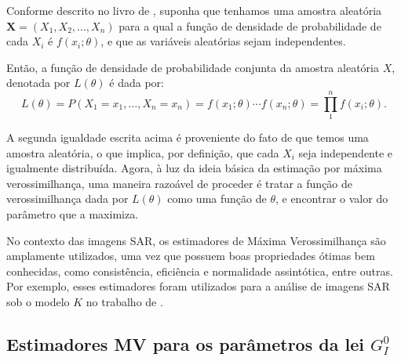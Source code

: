 Conforme descrito no livro de \citet{CasellaBergerStatisticalInference}, suponha que tenhamos uma amostra aleatória \begin{math} \bm X = (X_{1}, X_{2}, \dots, X_{n}) \end{math} para a qual a função de densidade de probabilidade de cada \begin{math} X_{i} \end{math} é \begin{math} f(x_{i}; \theta)\end{math}, e que as variáveis aleatórias sejam independentes.

Então, a função de densidade de probabilidade conjunta da amostra aleatória \begin{math} X \end{math}, denotada por \begin{math} L(\theta) \end{math} é dada por:
\begin{equation}
L(\theta) = P (X_{1} = x_{1}, \dots, X_{n} = x_{n}) =  f(x_{1}; \theta) \cdots f(x_{n}; \theta) =  \prod_{1}^{n} f(x_{i}; \theta).
\end{equation}

A segunda igualdade escrita acima é proveniente do fato de que temos uma amostra aleatória, o que implica, por definição, que cada \begin{math} X_{i} \end{math} seja independente e igualmente distribuída. Agora, à luz da ideia básica da estimação por máxima verossimilhança, uma maneira razoável de proceder é tratar a função de verossimilhança dada por \begin{math} L (\theta) \end{math} como uma função de \begin{math} \theta \end{math}, e encontrar o valor do parâmetro que a maximiza.

No contexto das imagens SAR, os estimadores de Máxima Verossimilhança são amplamente utilizados, uma vez que possuem boas propriedades ótimas bem conhecidas, como consistência, eficiência e normalidade assintótica, entre outras. 
Por exemplo, esses estimadores foram utilizados para a análise de imagens SAR sob o modelo $K$ no trabalho de \citet{KMaxVer_Joughin}.

\subsection{Estimadores MV para os parâmetros da lei $G_I^0$}

